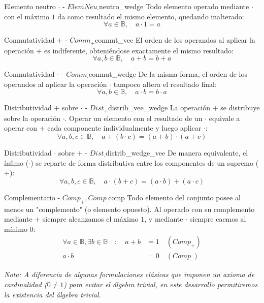 \begin{postulado}{Elemento neutro $\cdot$ - $ElemNeu_\cdot$}{neutro_wedge}
Todo elemento operado mediante $\cdot$ con el máximo $1$ da como resultado el mismo elemento, quedando inalterado:
\[ \forall a \in \mathbb{B}, \quad a \cdot 1 = a \]
\end{postulado}

\begin{postulado}{Conmutatividad $+$ - $Comm_+$}{conmut_vee}
El orden de los operandos al aplicar la operación $+$ es indiferente, obteniéndose exactamente el mismo resultado:
\[ \forall a, b \in \mathbb{B}, \quad a + b = b + a \]
\end{postulado}

\begin{postulado}{Conmutatividad $\cdot$ - $Comm_\cdot$}{conmut_wedge}
De la misma forma, el orden de los operandos al aplicar la operación $\cdot$ tampoco altera el resultado final:
\[ \forall a, b \in \mathbb{B}, \quad a \cdot b = b \cdot a \]
\end{postulado}

\begin{postulado}{Distributividad $+$ sobre $\cdot$ - $Dist_+$}{distrib_vee_wedge}
La operación $+$ se distribuye sobre la operación $\cdot$. Operar un elemento con el resultado de un $\cdot$ equivale a operar con $+$ cada componente individualmente y luego aplicar $\cdot$:
\[ \forall a, b, c \in \mathbb{B}, \quad a + (b \cdot c) = (a + b) \cdot (a + c) \]
\end{postulado}

\begin{postulado}{Distributividad $\cdot$ sobre $+$ - $Dist_\cdot$}{distrib_wedge_vee}
De manera equivalente, el ínfimo ($\cdot$) se reparte de forma distributiva entre los componentes de un supremo ($+$):
\[ \forall a, b, c \in \mathbb{B}, \quad a \cdot (b + c) = (a \cdot b) + (a \cdot c) \]
\end{postulado}

\begin{postulado}{Complementario - $Comp_+, Comp_\cdot$}{comp}
Todo elemento del conjunto posee al menos un "complemento" (o elemento opuesto). Al operarlo con su complemento mediante $+$ siempre alcanzamos el máximo $1$, y mediante $\cdot$ siempre caemos al mínimo $0$:
\begin{align*}
\forall a \in \mathbb{B}, \exists b \in \mathbb{B} \quad : \quad a + b &= 1 \quad (Comp_+) \\
a \cdot b &= 0 \quad (Comp_\cdot)
\end{align*}
\end{postulado}

\textit{Nota: A diferencia de algunas formulaciones clásicas que imponen un axioma de cardinalidad ($0 \neq 1$) para evitar el álgebra trivial, en este desarrollo permitiremos la existencia del álgebra trivial.}

